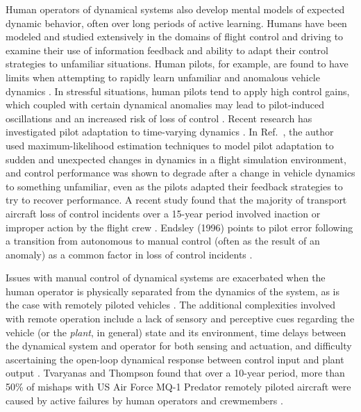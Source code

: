 Human operators of dynamical systems also develop mental models of expected dynamic behavior, often over long periods of active learning. Humans have been modeled and studied extensively in the domains of flight control \cite{hess2015modeling, zaal2016manual, mcruer1967review, phatak1969model} and driving \cite{macadam2003understanding} to examine their use of information feedback and ability to adapt their control strategies to unfamiliar situations. Human pilots, for example, are found to have limits when attempting to rapidly learn unfamiliar and anomalous vehicle dynamics \cite{hess2012modeling, hess2015modeling, endsley1995toward, zaal2016manual, oliver2017cognition}. In stressful situations, human pilots tend to apply high control gains, which coupled with certain dynamical anomalies may lead to pilot-induced oscillations and an increased risk of loss of control \cite{hess1997unified}. Recent research has investigated pilot adaptation to time-varying dynamics \cite{hess2009modeling, hess2015modeling, zaal2011estimation}. In  Ref.~\cite{zaal2016manual}, the author used maximum-likelihood estimation techniques to model pilot adaptation to sudden and unexpected changes in dynamics in a flight simulation environment, and control performance was shown to degrade after a change in vehicle dynamics to something unfamiliar, even as the pilots adapted their feedback strategies to try to recover performance. A recent study found that the majority of transport aircraft loss of control incidents over a 15-year period involved inaction or improper action by the flight crew \cite{belcastro2014preliminary}. Endsley (1996) points to pilot error following a transition from autonomous to manual control (often as the result of an anomaly) as a common factor in loss of control incidents \cite{endsley1996automation}. 

Issues with manual control of dynamical systems are exacerbated when the human operator is physically separated from the dynamics of the system, as is the case with remotely piloted vehicles \cite{mccarley2004human, tvaryanas2008recurrent}. The additional complexities involved with remote operation include a lack of sensory and perceptive cues regarding the vehicle (or the \textit{plant}, in general) state and its environment, time delays between the dynamical system and operator for both sensing and actuation, and difficulty ascertaining the open-loop dynamical response between control input and plant output \cite{lam2009artificial, lam2008haptic}. Tvaryanas and Thompson found that over a 10-year period, more than 50\% of mishaps with US Air Force MQ-1 Predator remotely piloted aircraft were caused by active failures by human operators and crewmembers \cite{tvaryanas2008recurrent}. 

